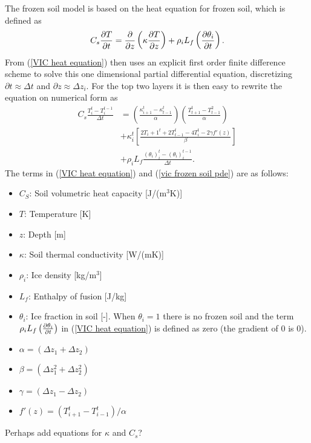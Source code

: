 The frozen soil model is based on the heat equation for frozen soil, which 
is defined as 
\begin{equation}
C_s\pdv{T}{t}=\pdv{}{z}\left( \kappa \pdv{T}{z} \right) + \rho_i L_f \left( \pdv{\theta_i}{t}\right).
\label{VIC heat equation}
\end{equation}
From (\ref{VIC heat equation}) \citet{VICFrozenSoil} then uses an explicit first order 
finite difference scheme to solve this one dimensional partial differential 
equation, discretizing $\partial t\approx \Delta t$ and $\partial z \approx \Delta z_i$.
For the top two layers it is then easy to rewrite the equation on numerical form as
\begin{align}
	C_s\frac{T_i^t - T_i^{t-1}}{\Delta t} &= \left( \frac{\kappa_{i+1}^t - 
	\kappa_{t-1}^t}{\alpha}\right) \left( \frac{T_{t+1}^t - T_{t-1}^2}{\alpha} 
	\right)\nonumber \\ &+ \kappa_i^t \left[ \frac{2T_i+1^t + 2T_{t-1}^t - 4T_i^t - 2\gamma 
	f'(z)}{\beta}  \right] \nonumber \\ &+ \rho_i L_f \frac{(\theta_i)_i^t - 
    (\theta_i)_i^{t-1}}{\Delta t}. \label{vic frozen soil pde}
\end{align}
The terms in (\ref{VIC heat equation}) and (\ref{vic frozen soil pde}) are as follows:
\begin{itemize}
    \item $C_S$: Soil volumetric heat capacity [J/(m$^3$K)]
    \item $T$: Temperature [K]
    \item $z$: Depth [m]
    \item $\kappa$: Soil thermal conductivity [W/(mK)]
    \item $\rho_i$: Ice density [kg/m$^3$]
    \item $L_f$: Enthalpy of fusion [J/kg]
    \item $\theta_i$: Ice fraction in soil [-]. When $\theta_i=1$ there is no frozen soil and the term $\rho_i L_f\left( \pdv{\theta_i}{t}\right) $ in (\ref{VIC heat equation}) is defined as zero (the gradient of 0 is 0).
    \item $\alpha = (\Delta z_1 + \Delta z_2)$
    \item $\beta = (\Delta z_1^2 + \Delta z_2^2)$
    \item $\gamma = (\Delta z_1 - \Delta z_2)$
    \item $f'(z)=(T_{i+1}^t - T_{i-1}^t) / \alpha$
\end{itemize}


Perhaps add equations for $\kappa$ and $C_s$?


